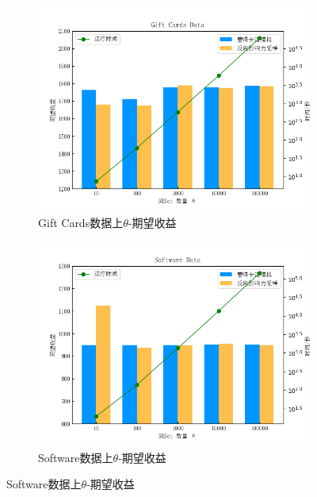 \begin{figure}[th]
    \centering
    \begin{subfigure}{0.45\textwidth}
        \includegraphics[width=\linewidth]{figure/sasim/theta/cn_gift}
        \caption{Gift Cards数据上$\theta$-期望收益}
        \label{fig:thetasub1}
    \end{subfigure}
    \hfill
    \begin{subfigure}{0.45\textwidth}
        \includegraphics[width=\linewidth]{figure/sasim/theta/cn_software}
        \caption{Software数据上$\theta$-期望收益}
        \label{fig:thetasub2}
    \end{subfigure}

    \medskip


\end{figure}
